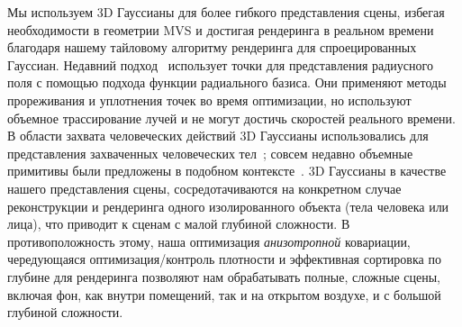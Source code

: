 Мы используем 3D Гауссианы для более гибкого представления сцены, избегая необходимости в геометрии MVS и достигая рендеринга в реальном времени благодаря нашему тайловому алгоритму рендеринга для спроецированных Гауссиан.
Недавний подход~\cite{xu2022point} использует точки для представления радиусного поля с помощью подхода функции радиального базиса. Они применяют методы прореживания и уплотнения точек во время оптимизации, но используют объемное трассирование лучей и не могут достичь скоростей реального времени.%
В области захвата человеческих действий 3D Гауссианы использовались для представления захваченных человеческих тел~\cite{stoll2011fast,rhodin2015versatile}; совсем недавно   объемные примитивы были предложены в подобном контексте~\cite{lombardi2021mixture}.  3D Гауссианы в качестве нашего представления сцены,  сосредотачиваются на конкретном случае реконструкции и рендеринга одного изолированного объекта (тела человека или лица), что приводит к сценам с малой глубиной сложности. В противоположность этому, наша оптимизация \emph{анизотропной} ковариации, чередующаяся оптимизация/контроль плотности и эффективная сортировка по глубине для рендеринга позволяют нам обрабатывать полные, сложные сцены, включая фон, как внутри помещений, так и на открытом воздухе, и с большой глубиной сложности.